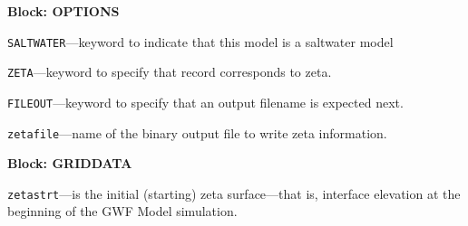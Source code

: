
\item \textbf{Block: OPTIONS}

\begin{description}
\item \texttt{SALTWATER}---keyword to indicate that this model is a saltwater model

\item \texttt{ZETA}---keyword to specify that record corresponds to zeta.

\item \texttt{FILEOUT}---keyword to specify that an output filename is expected next.

\item \texttt{zetafile}---name of the binary output file to write zeta information.

\end{description}
\item \textbf{Block: GRIDDATA}

\begin{description}
\item \texttt{zetastrt}---is the initial (starting) zeta surface---that is, interface elevation at the beginning of the GWF Model simulation.

\end{description}

